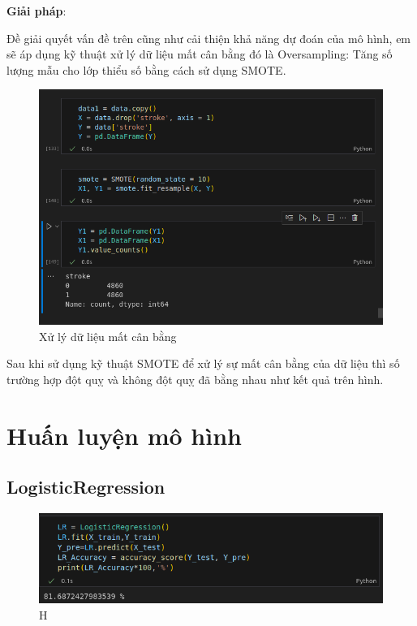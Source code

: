 \documentclass[11pt]{article}
\begin{document}
	\textbf{Giải pháp}:
	\begin{flushleft}
		Đề giải quyết vấn đề trên cũng như cải thiện khả năng dự đoán của mô hình, em sẽ áp dụng kỹ thuật xử lý dữ liệu mất cân bằng đó là Oversampling: Tăng số lượng mẫu cho lớp thiểu số bằng cách sử dụng SMOTE.
		
		\begin{figure}[H]
			\centering
			\includegraphics[width=0.7\linewidth]{solBalanceData}
			\caption{Xử lý dữ liệu mất cân bằng}
			\label{fig:solbalancedata}
		\end{figure}
		
		Sau khi sử dụng kỹ thuật SMOTE để xử lý sự mất cân bằng của dữ liệu thì số trường hợp đột quỵ và không đột quỵ đã bằng nhau như kết quả trên hình.
	\end{flushleft}
	
	\section{Huấn luyện mô hình}
	
	\subsection{LogisticRegression}
	
	\begin{figure}[H]
		\centering
		\includegraphics[width=0.7\linewidth]{LogisticRegression/screenshot001}H
		\caption{}
		\label{fig:screenshot001}
	\end{figure}
	
\end{document}

